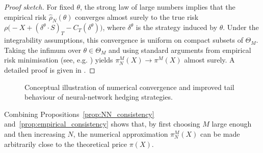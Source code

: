 \documentclass[12pt,a4paper]{article}
\theoremstyle{definition}
\theoremstyle{plain}
\theoremstyle{remark}
\theoremstyle{plain}
\begin{document}
\begin{proof}[Proof sketch]
For fixed $\theta$, the strong law of large numbers implies that the empirical risk $\widehat{\rho}_N(\theta)$ converges almost surely to the true risk $\rho\bigl(-X + (\delta^\theta\!\cdot S)_T - C_T(\delta^\theta)\bigr)$, where $\delta^\theta$ is the strategy induced by $\theta$.
Under the integrability assumptions, this convergence is uniform on compact subsets of $\Theta_M$.
Taking the infimum over $\theta\in\Theta_M$ and using standard arguments from empirical risk minimisation (see, e.g. \cite{Buehler2019DeepHedging,HighamHigham2019DeepLearning}) yields $\pi^{M}_N(X)\to\pi^{M}(X)$ almost surely.
A detailed proof is given in \cite{Buehler2019DeepHedging}.
\end{proof}
\FloatBarrier
\begin{figure}[!ht]
\centering
{}
\caption{Conceptual illustration of numerical convergence and improved tail behaviour of neural-network hedging strategies.}
\label{fig:nn_convergence}
\end{figure}
\FloatBarrier

Combining Propositions~\ref{prop:NN_consistency} and~\ref{prop:empirical_consistency} shows that, by first choosing $M$ large enough and then increasing $N$, the numerical approximation $\pi^{M}_N(X)$ can be made arbitrarily close to the theoretical price $\pi(X)$.
\end{document}
